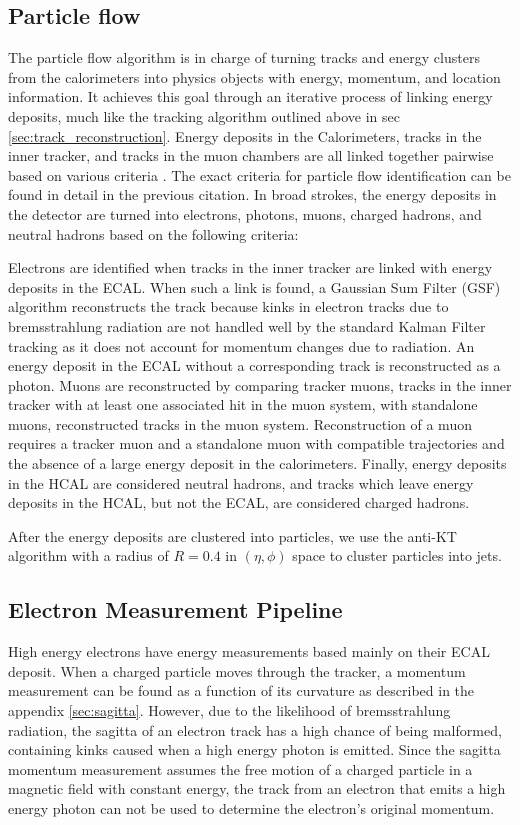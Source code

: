   \subsection{Particle flow} \label{sec:particle_flow}
    The particle flow algorithm is in charge of turning tracks and energy clusters from the calorimeters into physics objects with energy, momentum, and location information. It achieves this goal through an iterative process of linking energy deposits, much like the tracking algorithm outlined above in sec \ref{sec:track_reconstruction}. Energy deposits in the Calorimeters, tracks in the inner tracker, and tracks in the muon chambers are all linked together pairwise based on various criteria \cite[sec. 4]{cms_particleflow}. The exact criteria for particle flow identification can be found in detail in the previous citation. In broad strokes, the energy deposits in the detector are turned into electrons, photons, muons, charged hadrons, and neutral hadrons based on the following criteria:

    Electrons are identified when tracks in the inner tracker are linked with energy deposits in the ECAL. When such a link is found, a Gaussian Sum Filter (GSF) \cite{cms_gsf} algorithm reconstructs the track because kinks in electron tracks due to bremsstrahlung radiation are not handled well by the standard Kalman Filter tracking as it does not account for momentum changes due to radiation. An energy deposit in the ECAL without a corresponding track is reconstructed as a photon. Muons are reconstructed by comparing tracker muons, tracks in the inner tracker with at least one associated hit in the muon system, with standalone muons, reconstructed tracks in the muon system. Reconstruction of a muon requires a tracker muon and a standalone muon with compatible trajectories and the absence of a large energy deposit in the calorimeters. Finally, energy deposits in the HCAL are considered neutral hadrons, and tracks which leave energy deposits in the HCAL, but not the ECAL, are considered charged hadrons.

    After the energy deposits are clustered into particles, we use the anti-KT algorithm with a radius of $R=0.4$ in $(\eta, \phi)$ space to cluster particles into jets.\cite{cms_jet_performance} 


  \subsection{Electron Measurement Pipeline} \label{sec:electron_measurement_pipeline}
    High energy electrons have energy measurements based mainly on their ECAL deposit. When a charged particle moves through the tracker, a momentum measurement can be found as a function of its curvature as described in the appendix \ref{sec:sagitta}. However, due to the likelihood of bremsstrahlung radiation, the sagitta of an electron track has a high chance of being malformed, containing kinks caused when a high energy photon is emitted. Since the sagitta momentum measurement assumes the free motion of a charged particle in a magnetic field with constant energy, the track from an electron that emits a high energy photon can not be used to determine the electron's original momentum.

